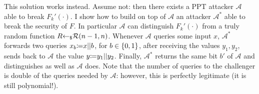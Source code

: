 \begin{enumerate}[(a)]
\begin{enumerate}[(i)]
		            \begin{solution}
			            This solution works instead. Assume not: then there exists a PPT attacker $\mathcal{A}$ able to break $F_k'(\cdot)$. I show how to build on top of $\mathcal{A}$ an attacker $\mathcal{A}^*$ able to break the security of $F$. In particular $\mathcal{A}$ can distinguish $F_k'(\cdot)$ from a truly random function $R {\leftarrow_\$} \mathcal{R}(n-1, n)$. Whenever $\mathcal{A}$ queries some input $x$, $\mathcal{A}^*$ forwards two queries $x_b{\coloneqq} x || b$, for $b \in {\{0, 1\}}$, after receiving the values $y_1, y_2$, sends back to $\mathcal{A}$ the value $y{\coloneqq} y_1 || y_2$.
			            Finally, $\mathcal{A}^*$ returns the same bit $b'$ of $\mathcal{A}$ and distinguishes as well as $\mathcal{A}$ does. Note that the number of queries to the challenger is double of the queries needed by $\mathcal{A}$: however, this is perfectly legitimate (it is still polynomial!).
		            \end{solution}

	      \end{enumerate}
\end{enumerate}